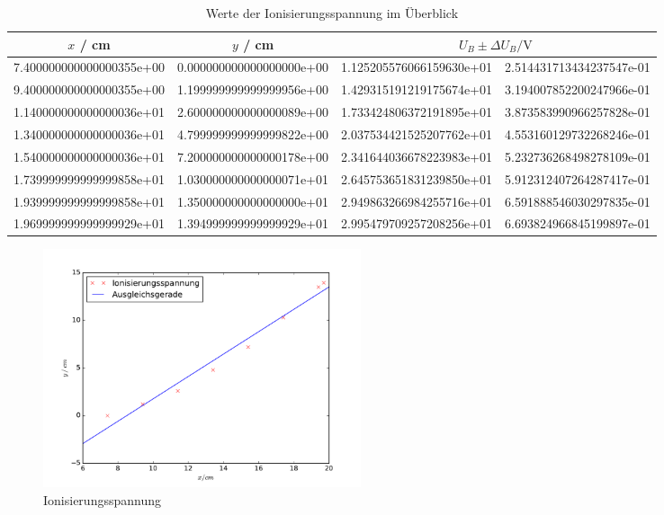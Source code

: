 \begin{table}
  \centering
  \begin{tabular}{S[scientific-notation = fixed, fixed-exponent = 0, round-precision =1] S[scientific-notation = fixed, fixed-exponent = 0, round-precision =1] S[scientific-notation = fixed, fixed-exponent = 0]@{$ \; \pm$} S[scientific-notation = fixed, fixed-exponent = 0]}
    \toprule
    $ x $ / \si{\centi \meter} & $y$ / \si{\centi \meter} &  \\
    \midrule
    7.400000000000000355e+00 & 0.000000000000000000e+00 & 1.125205576066159630e+01 & 2.514431713434237547e-01\\
    9.400000000000000355e+00 & 1.199999999999999956e+00 & 1.429315191219175674e+01 & 3.194007852200247966e-01\\
    1.140000000000000036e+01 & 2.600000000000000089e+00 & 1.733424806372191895e+01 & 3.873583990966257828e-01\\
    1.340000000000000036e+01 & 4.799999999999999822e+00 & 2.037534421525207762e+01 & 4.553160129732268246e-01\\
    1.540000000000000036e+01 & 7.200000000000000178e+00 & 2.341644036678223983e+01 & 5.232736268498278109e-01\\
    1.739999999999999858e+01 & 1.030000000000000071e+01 & 2.645753651831239850e+01 & 5.912312407264287417e-01\\
    1.939999999999999858e+01 & 1.350000000000000000e+01 & 2.949863266984255716e+01 & 6.591888546030297835e-01\\
    1.969999999999999929e+01 & 1.394999999999999929e+01 & 2.995479709257208256e+01 & 6.693824966845199897e-01\\
    \bottomrule
  \end{tabular}
  \caption{Werte der Ionisierungsspannung im Überblick}
  \label{tab:iotab}
\end{table}

\begin{figure}
  \centering
  \includegraphics[height=7cm]{plots/8cplot.pdf}
  \caption{Ionisierungsspannung}
  \label{fig:io}
\end{figure}

